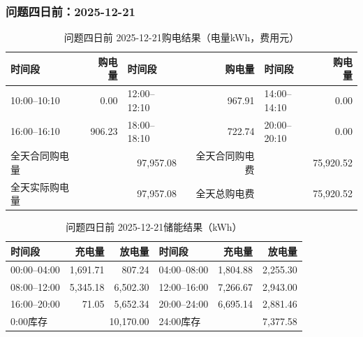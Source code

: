 \par\medskip
\par\noindent\begin{minipage}{\textwidth}
\subsubsection*{问题四日前：2025-12-21}
\begin{table}[H]\centering\small\setlength{\tabcolsep}{4pt}\caption{问题四日前 2025-12-21购电结果（电量kWh，费用元）}
\begin{tabular}{lr lr lr}\toprule
时间段 & 购电量 & 时间段 & 购电量 & 时间段 & 购电量\\\midrule
10:00--10:10 & 0.00 & 12:00--12:10 & 967.91 & 14:00--14:10 & 0.00\\
16:00--16:10 & 906.23 & 18:00--18:10 & 722.74 & 20:00--20:10 & 0.00\\
\midrule
全天合同购电量 & \multicolumn{2}{r}{97,957.08} & 全天合同购电费 & \multicolumn{2}{r}{75,920.52}\\
全天实际购电量 & \multicolumn{2}{r}{97,957.08} & 全天总购电费 & \multicolumn{2}{r}{75,920.52}\\
\bottomrule\end{tabular}\end{table}
\begin{table}[H]\centering\small\setlength{\tabcolsep}{4pt}\caption{问题四日前 2025-12-21储能结果（kWh）}
\begin{tabular}{lrr lrr}\toprule
时间段 & 充电量 & 放电量 & 时间段 & 充电量 & 放电量\\\midrule
00:00--04:00 & 1,691.71 & 807.24 & 04:00--08:00 & 1,804.88 & 2,255.30\\
08:00--12:00 & 5,345.18 & 6,502.30 & 12:00--16:00 & 7,266.67 & 2,943.00\\
16:00--20:00 & 71.05 & 5,652.34 & 20:00--24:00 & 6,695.14 & 2,881.46\\
\midrule
0:00库存 & \multicolumn{2}{r}{10,170.00} & 24:00库存 & \multicolumn{2}{r}{7,377.58}\\
\bottomrule\end{tabular}\end{table}
\end{minipage}\par
